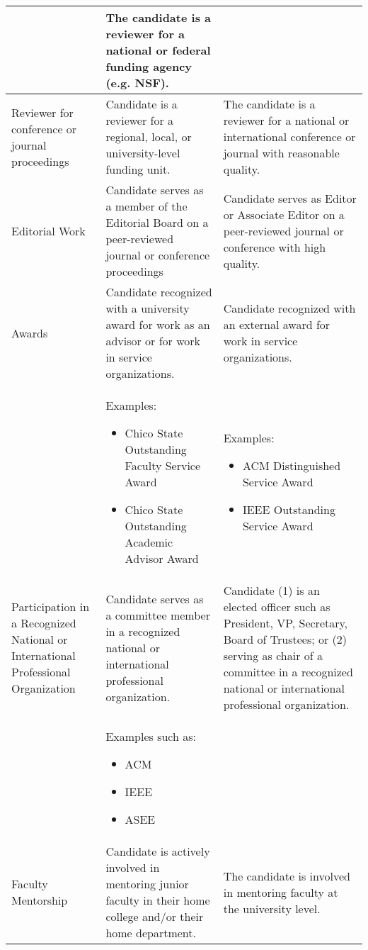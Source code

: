 \documentclass{article}
\begin{document}
\begin{longtable}{p{3cm}p{5.5cm}P{5.5cm}}
 & The candidate is a reviewer for a national or federal funding agency (e.g. NSF).\\ 
 \hline
  Reviewer for conference or journal proceedings
 & Candidate is a reviewer for a regional, local, or
university-level funding unit.%
 & The candidate is a reviewer for
a national or international
conference or journal with
reasonable quality.\\ 
 \hline
   Editorial Work
 & Candidate serves as a member of the Editorial Board on a peer-reviewed journal or conference proceedings%
 & Candidate serves as Editor or Associate Editor on a
peer-reviewed journal or conference with high quality.
\\ 
 \hline
 Awards & Candidate recognized with a university award for work as an advisor or for work in service organizations. & Candidate recognized with an external award for work in service organizations.\\
 &
 Examples:
	\begin{itemize}[noitemsep,leftmargin=*,topsep=0pt,partopsep=0pt]
    \item Chico State Outstanding Faculty Service Award
    \item Chico State Outstanding Academic Advisor Award
	\end{itemize}
  & %
  Examples:
    \begin{itemize}[noitemsep,leftmargin=*,topsep=0pt,partopsep=0pt]
        \item ACM Distinguished Service Award
        \item IEEE Outstanding Service Award
    \end{itemize}\\ 
\hline
 Participation in a Recognized National or International Professional Organization & Candidate serves as a committee member in a recognized national or international professional organization.& Candidate (1) is an elected officer such as President, VP, Secretary, Board of Trustees; or (2) serving as chair of a committee in a recognized national or international professional organization.\\
 &
 Examples such as:
	\begin{itemize}[noitemsep,leftmargin=*,topsep=0pt,partopsep=0pt]
    \item ACM
    \item IEEE
    \item ASEE
	\end{itemize}
  &\\ 
\hline
 Faculty Mentorship & Candidate is actively involved in mentoring junior faculty in their home college and/or their home department.& The candidate is involved in mentoring faculty at the university level. \\

\end{longtable}
\end{document}
